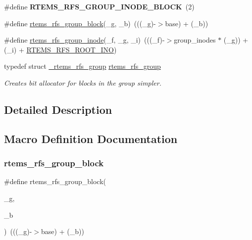 \begin{DoxyCompactItemize}
\#define {\bfseries R\+T\+E\+M\+S\+\_\+\+R\+F\+S\+\_\+\+G\+R\+O\+U\+P\+\_\+\+I\+N\+O\+D\+E\+\_\+\+B\+L\+O\+CK}~(2)
\item 
\#define \mbox{\hyperlink{group__rtems__rfs_gad8e415ce1837c044b5f079c520b00366}{rtems\+\_\+rfs\+\_\+group\+\_\+block}}(\+\_\+g,  \+\_\+b)~(((\+\_\+g)-\/$>$base) + (\+\_\+b))
\item 
\#define \mbox{\hyperlink{group__rtems__rfs_ga74d3313e202ae23fcb1f4c4e58b49032}{rtems\+\_\+rfs\+\_\+group\+\_\+inode}}(\+\_\+f,  \+\_\+g,  \+\_\+i)~(((\+\_\+f)-\/$>$group\+\_\+inodes $\ast$ (\+\_\+g)) + (\+\_\+i) + \mbox{\hyperlink{rtems-rfs-file-system_8h_a341dd2280c086baadd35b5e4471ff416}{R\+T\+E\+M\+S\+\_\+\+R\+F\+S\+\_\+\+R\+O\+O\+T\+\_\+\+I\+NO}})
\item 
typedef struct \mbox{\hyperlink{struct__rtems__rfs__group}{\+\_\+rtems\+\_\+rfs\+\_\+group}} \mbox{\hyperlink{group__rtems__rfs_ga0e7b27c60e21039ef07a8c843fa8a3e5}{rtems\+\_\+rfs\+\_\+group}}
\begin{DoxyCompactList}\small\item\em Creates bit allocator for blocks in the group simpler. \end{DoxyCompactList}\end{DoxyCompactItemize}


\subsection{Detailed Description}


\subsection{Macro Definition Documentation}
\mbox{\label{group__rtems__rfs_gad8e415ce1837c044b5f079c520b00366}} 
\subsubsection{\texorpdfstring{rtems\_rfs\_group\_block}{rtems\_rfs\_group\_block}}
{\footnotesize\ttfamily \#define rtems\+\_\+rfs\+\_\+group\+\_\+block(\begin{DoxyParamCaption}\item[{}]{\+\_\+g,  }\item[{}]{\+\_\+b }\end{DoxyParamCaption})~(((\+\_\+g)-\/$>$base) + (\+\_\+b))}

